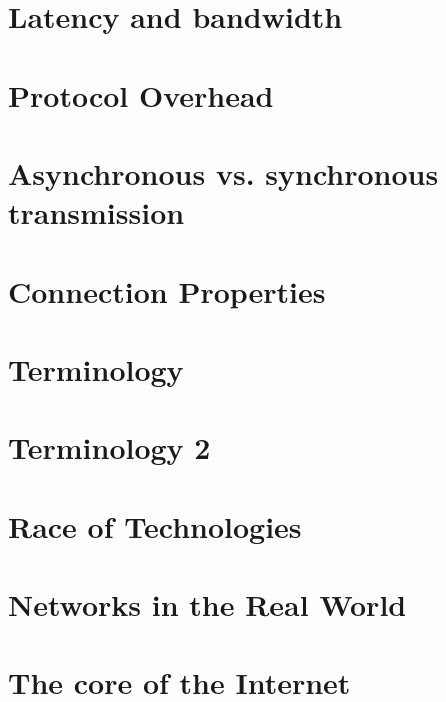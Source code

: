 \documentclass[a4paper,10pt]{scrartcl}
\begin{document}
\section{Latency and bandwidth}
\section{Protocol Overhead}
\section{Asynchronous vs. synchronous transmission}
\section{Connection Properties}
\section{Terminology}
\section{Terminology 2}
\section{Race of Technologies}
\section{Networks in the Real World}
\section{The core of the Internet}
\end{document}
